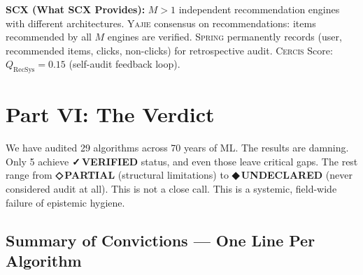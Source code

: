\documentclass[12pt,a4paper]{article}
\theoremstyle{definition}
\newcommand{\guilty}{{\color{guiltycolor}\textbf{◆\,UNDECLARED}}}
\newcommand{\weakness}{{\color{weakcolor}\textbf{◇\,PARTIAL}}}
\newcommand{\verified}{{\color{verifiedcolor}\textbf{✓\,VERIFIED}}}
\newcommand{\Yajie}{\textsc{Yajie}}
\newcommand{\Spring}{\textsc{Spring}}
\newcommand{\Cercis}{\textsc{Cercis}}
\newcommand{\whatMissing}{\noindent\textbf{SCX (What SCX Provides):} }
\begin{document}
\whatMissing{} $M>1$ independent recommendation engines with different architectures. \Yajie{} consensus on recommendations: items recommended by all $M$ engines are verified. \Spring{} permanently records (user, recommended items, clicks, non-clicks) for retrospective audit. \Cercis{} Score: $Q_{\text{RecSys}} = 0.15$ (self-audit feedback loop).

\section{Part VI: The Verdict }
\label{sec:verdict}

We have audited 29 algorithms across 70 years of ML. The results are damning. Only 5 achieve \verified{} status, and even those leave critical gaps. The rest range from \weakness{} (structural limitations) to \guilty{} (never considered audit at all). This is not a close call. This is a systemic, field-wide failure of epistemic hygiene.

\subsection{Summary of Convictions — One Line Per Algorithm }
\end{document}
